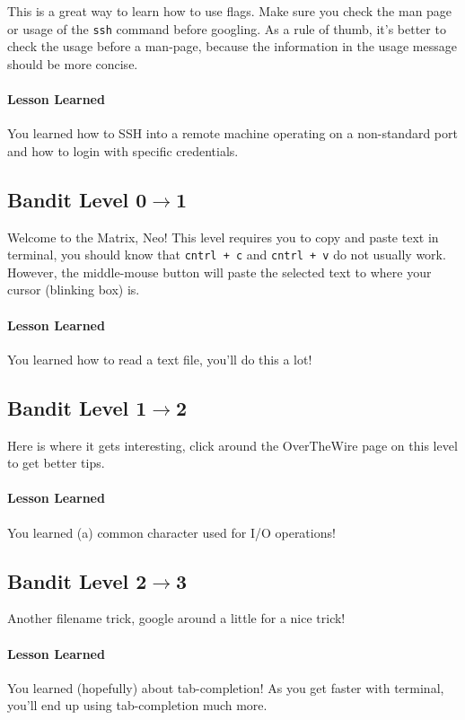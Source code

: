 \documentclass[12pt]{article}
\begin{document}
This is a great way to learn how to use flags.
Make sure you check the man page or usage of the \verb|ssh| command before googling.
As a rule of thumb, it's better to check the usage before a man-page, because the information in the usage message should be more concise.

\paragraph{Lesson Learned}
You learned how to SSH into a remote machine operating on a non-standard port and how to login with specific credentials.

\subsection{Bandit Level 0$\to$1}

Welcome to the Matrix, Neo!
This level requires you to copy and paste text in terminal, you should know that \verb|cntrl + c| and \verb|cntrl + v| do not usually work.
However, the middle-mouse button will paste the selected text to where your cursor (blinking box) is.

\paragraph{Lesson Learned}
You learned how to read a text file, you'll do this a lot!

\subsection{Bandit Level 1$\to$2}

Here is where it gets interesting, click around the OverTheWire page on this level to get better tips.

\paragraph{Lesson Learned}
You learned (a) common character used for I/O operations!

\subsection{Bandit Level 2$\to$3}

Another filename trick, google around a little for a nice trick!

\paragraph{Lesson Learned}
You learned (hopefully) about tab-completion!
As you get faster with terminal, you'll end up using tab-completion much more.
\end{document}
